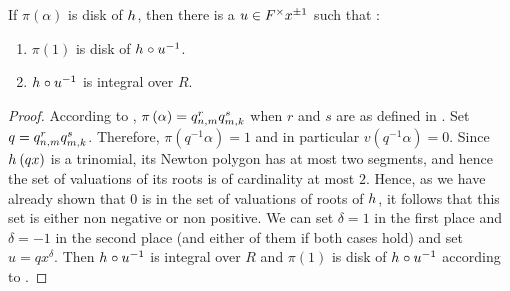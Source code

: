\documentclass[../main.tex]{subfiles}
\begin{document}
  \begin{lemma}
    \label{lem:reduction}
    If $\pi\left( \alpha \right)$ is \anex disk of $h_{}$, then there is a $u \in F^\times x^{\pm 1}$ such that : 
    \begin{enumerate}
      \item 
      $\pi\left( 1 \right)$ is \anex disk of $h_{} \circ u^{-1}$.
      \item 
      $h_{} \circ u^{-1}$ is integral over $R$.
    \end{enumerate}
  \end{lemma}
  \begin{proof}
    According to , $\pi\left( \alpha \right) = q_{n, m}^r q_{m, k}^s$ when $r$ and $s$ are as defined in .
    Set $q = q_{n, m}^r q_{m, k}^s$.
    Therefore, $\pi\left( q^{-1}\alpha \right) = 1$ and in particular $v\left( q^{-1}\alpha \right) = 0$.
    Since $h_{}\left( qx \right)$ is a trinomial, its Newton polygon has at most two segments, and hence the set of valuations of its roots is of cardinality at most $2$.
    Hence, as we have already shown that $0$ is in the set of valuations of roots of $h_{}$, it follows that this set is either non negative or non positive.
    We can set $\delta = 1$ in the first place and $\delta = -1$ in the second place (and either of them if both cases hold) and set $u = q x^\delta$.
    Then $h_{} \circ u^{-1}$ is integral over $R$ and $\pi\left( 1 \right)$ is \anex disk of $h_{} \circ u^{-1}$ according to .
  \end{proof}
  
\end{document}
